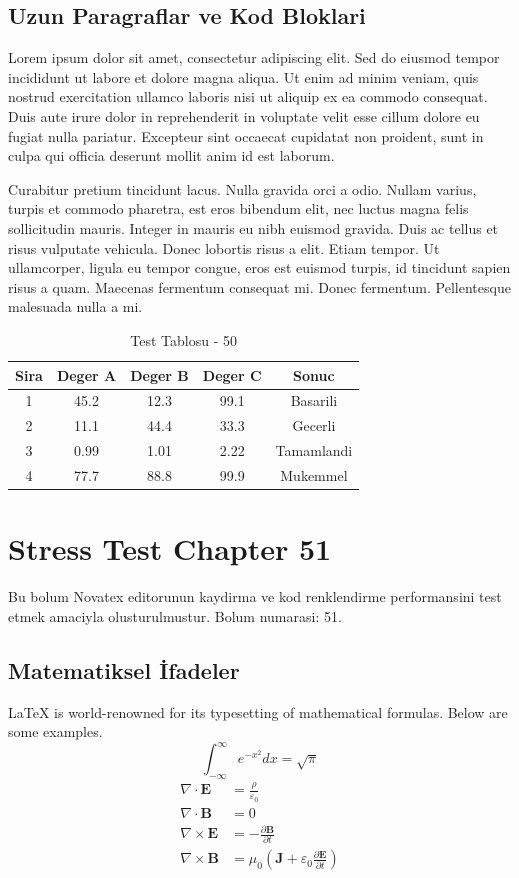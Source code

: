 \documentclass[12pt,a4paper]{article}
\begin{document}
\subsection{Uzun Paragraflar ve Kod Bloklari}
Lorem ipsum dolor sit amet, consectetur adipiscing elit. Sed do eiusmod tempor incididunt ut labore et dolore magna aliqua. Ut enim ad minim veniam, quis nostrud exercitation ullamco laboris nisi ut aliquip ex ea commodo consequat. Duis aute irure dolor in reprehenderit in voluptate velit esse cillum dolore eu fugiat nulla pariatur. Excepteur sint occaecat cupidatat non proident, sunt in culpa qui officia deserunt mollit anim id est laborum.

Curabitur pretium tincidunt lacus. Nulla gravida orci a odio. Nullam varius, turpis et commodo pharetra, est eros bibendum elit, nec luctus magna felis sollicitudin mauris. Integer in mauris eu nibh euismod gravida. Duis ac tellus et risus vulputate vehicula. Donec lobortis risus a elit. Etiam tempor. Ut ullamcorper, ligula eu tempor congue, eros est euismod turpis, id tincidunt sapien risus a quam. Maecenas fermentum consequat mi. Donec fermentum. Pellentesque malesuada nulla a mi.

\begin{table}[h!]
\centering
\begin{tabular}{|c|c|c|c|c|}
\hline
\textbf{Sira} & \textbf{Deger A} & \textbf{Deger B} & \textbf{Deger C} & \textbf{Sonuc} \\
\hline
1 & 45.2 & 12.3 & 99.1 & Basarili \\
2 & 11.1 & 44.4 & 33.3 & Gecerli \\
3 & 0.99 & 1.01 & 2.22 & Tamamlandi \\
4 & 77.7 & 88.8 & 99.9 & Mukemmel \\
\hline
\end{tabular}
\caption{Test Tablosu - 50}
\end{table}

\newpage
\section{Stress Test Chapter 51}
Bu bolum Novatex editorunun kaydirma ve kod renklendirme performansini test etmek amaciyla olusturulmustur. Bolum numarasi: 51.

\subsection{Matematiksel İfadeler}
\LaTeX{} is world-renowned for its typesetting of mathematical formulas. Below are some examples.
\begin{equation}
\int_{-\infty}^{\infty} e^{-x^2} dx = \sqrt{\pi}
\end{equation}
\begin{align}
\nabla \cdot \mathbf{E} &= \frac{\rho}{\varepsilon_0} \\
\nabla \cdot \mathbf{B} &= 0 \\
\nabla \times \mathbf{E} &= -\frac{\partial \mathbf{B}}{\partial t} \\
\nabla \times \mathbf{B} &= \mu_0\left(\mathbf{J} + \varepsilon_0 \frac{\partial \mathbf{E}}{\partial t}\right)
\end{align}
\end{document}
